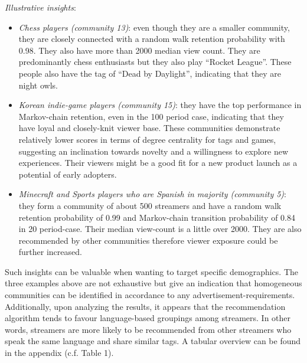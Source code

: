 \documentclass[11pt, oneside]{article}   	%
\begin{document}
\textit{Illustrative insights}:
\begin{itemize}
\item \textit{Chess players (community 13)}: even though they are a smaller community, they are closely connected with a random walk retention probability with 0.98. They also have more than 2000 median view count. They are predominantly chess enthusiasts but they also play “Rocket League”. These people also have the tag of “Dead by Daylight”, indicating that they are night owls.
\item \textit{Korean indie-game players (community 15)}: they have the top performance in Markov-chain retention, even in the 100 period case, indicating that they have loyal and closely-knit viewer base. These communities demonstrate relatively lower scores in terms of degree centrality for tags and games, suggesting an inclination towards novelty and a willingness to explore new experiences. Their viewers might be a good fit for a new product launch as a potential of early adopters.
\item \textit{Minecraft and Sports players who are Spanish in majority (community 5)}: they form a community of about 500 streamers and have a random walk retention probability of 0.99 and Markov-chain transition probability of 0.84 in 20 period-case. Their median view-count is a little over 2000. They are also recommended by other communities therefore viewer exposure could be further increased.
\end{itemize}

Such insights can be valuable when wanting to target specific demographics. The three examples above are not exhaustive but give an indication that homogeneous communities can be identified in accordance to any advertisement-requirements. Additionally, upon analyzing the results, it appears that the recommendation algorithm tends to favour language-based groupings among streamers. In other words, streamers are more likely to be recommended from other streamers who speak the same language and share similar tags. A tabular overview can be found in the appendix (c.f. Table 1). 
\newpage
\end{document}
